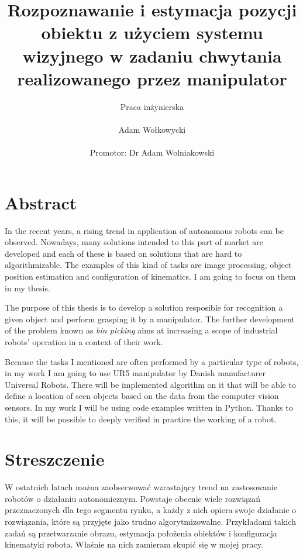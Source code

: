 \documentclass[12pt]{article}
\begin{document}
\title{Rozpoznawanie i estymacja pozycji obiektu z użyciem systemu wizyjnego w zadaniu chwytania realizowanego przez manipulator}
\author{
	Praca inżynierska \\\\
	Adam Wołkowycki \\\\
	Promotor: Dr Adam Wolniakowski
}
\maketitle

\newpage
\section*{Abstract}
In the recent years, a rising trend in application of autonomous robots can be observed. Nowadays, many solutions intended to this part of market are developed and each of these is based on solutions that are hard to algorithmizable. The examples of this kind of tasks are image processing, object position estimation and configuration of kinematics. I am going to focus on them in my thesis.

The purpose of this thesis is to develop a solution resposible for recognition a given object and perform grasping it by a manipulator. The further development of the problem known as \emph{bin picking} aims at increasing a scope of industrial robots' operation in a context of their work.

Because the tasks I mentioned are often performed by a particular type of robots, in my work I am going to use UR5 manipulator by Danish manufacturer Universal Robots. There will be implemented algorithm on it that will be able to define a location of seen objects based on the data from the computer vision sensors. In my work I will be using code examples written in Python. Thanks to this, it will be possible to deeply verified in practice the working of a robot.

\newpage
\section*{Streszczenie}
W ostatnich latach można zaobserwować wzrastający trend na zastosowanie robotów o działaniu autonomicznym. Powstaje obecnie wiele rozwiązań przeznaczonych dla tego segmentu rynku, a każdy z nich opiera swoje działanie o rozwiązania, które są przyjęte jako trudno algorytmizowalne. Przykładami takich zadań są przetwarzanie obrazu, estymacja położenia obiektów i konfiguracja kinematyki robota. Właśnie na nich zamieram skupić się w mojej pracy.
\end{document}
